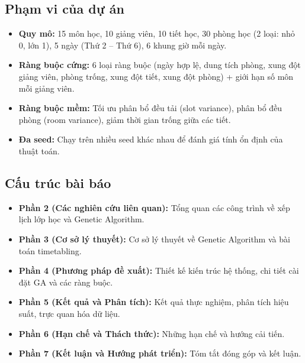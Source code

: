 \subsection{Phạm vi của dự án}
\begin{itemize}
    \item \textbf{Quy mô:} 15 môn học, 10 giảng viên, 10 tiết học, 30 phòng học (2 loại: nhỏ 0, lớn 1), 5 ngày (Thứ 2 -- Thứ 6), 6 khung giờ mỗi ngày.
    \item \textbf{Ràng buộc cứng:} 6 loại ràng buộc (ngày hợp lệ, dung tích phòng, xung đột giảng viên, phòng trống, xung đột tiết, xung đột phòng) + giới hạn số môn mỗi giảng viên.
    \item \textbf{Ràng buộc mềm:} Tối ưu phân bổ đều tải (slot variance), phân bổ đều phòng (room variance), giảm thời gian trống giữa các tiết.
    \item \textbf{Đa seed:} Chạy trên nhiều seed khác nhau để đánh giá tính ổn định của thuật toán.
\end{itemize}

\subsection{Cấu trúc bài báo}
\begin{itemize}
    \item \textbf{Phần 2 (Các nghiên cứu liên quan):} Tổng quan các công trình về xếp lịch lớp học và Genetic Algorithm.
    \item \textbf{Phần 3 (Cơ sở lý thuyết):} Cơ sở lý thuyết về Genetic Algorithm và bài toán timetabling.
    \item \textbf{Phần 4 (Phương pháp đề xuất):} Thiết kế kiến trúc hệ thống, chi tiết cài đặt GA và các ràng buộc.
    \item \textbf{Phần 5 (Kết quả và Phân tích):} Kết quả thực nghiệm, phân tích hiệu suất, trực quan hóa dữ liệu.
    \item \textbf{Phần 6 (Hạn chế và Thách thức):} Những hạn chế và hướng cải tiến.
    \item \textbf{Phần 7 (Kết luận và Hướng phát triển):} Tóm tắt đóng góp và kết luận.
\end{itemize}
